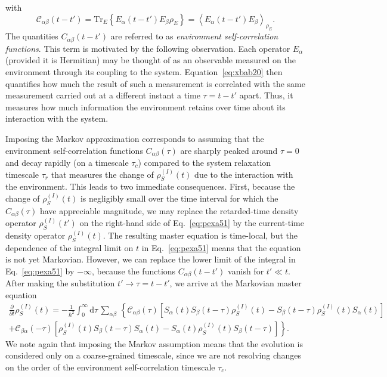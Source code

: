 \documentclass[3p,sort&compress]{elsarticle}
\newcommand{\D}{\ensuremath{\mathrm{d}}}
\newcommand{\op}[1]{#1}
\begin{document}
%
with
%
\begin{equation}
  \label{eq:xbab20}
\mathcal{C}_{\alpha\beta}(t-t') = \text{Tr}_E \left\{ \op{E}_\alpha(t-t')
    \op{E}_\beta \op{\rho}_E\right\} = \left\langle \op{E}_\alpha(t-t') \op{E}_\beta
  \right\rangle_{\op{\rho}_E}.
\end{equation}
%
The quantities $C_{\alpha\beta}(t-t')$ are referred to as \emph{environment self-correlation functions}. This term is motivated by the following observation. Each operator $\op{E}_\alpha$ (provided it is Hermitian) may be thought of as an observable measured on the environment through its coupling to the system. Equation~\eqref{eq:xbab20} then quantifies how much the result of such a measurement is correlated with the same measurement carried out at a different instant a time $\tau=t-t'$ apart. Thus, it measures how much information the environment retains over time about its interaction with the system. 

Imposing the Markov approximation corresponds to assuming that the environment self-correlation functions $C_{\alpha\beta}(\tau)$ are sharply peaked around $\tau = 0$ and decay rapidly (on a timescale $\tau_c$) compared to the system relaxation timescale $\tau_r$ that measures the change of $\op{\rho}^{(I)}_S(t)$ due to the interaction with the environment. This leads to two immediate consequences. First, because the change of $\op{\rho}^{(I)}_S(t)$ is negligibly small over the time interval for which the $C_{\alpha\beta}(\tau)$ have appreciable magnitude, we may replace the retarded-time density operator $\op{\rho}^{(I)}_S(t')$ on the right-hand side of Eq.~\eqref{eq:pexa51} by the current-time density operator $\op{\rho}^{(I)}_S(t)$. The resulting master equation is time-local, but the dependence of the integral limit on $t$ in Eq.~\eqref{eq:pexa51} means that the equation is not yet Markovian. However, we can replace the lower limit of the integral  in Eq.~\eqref{eq:pexa51} by $-\infty$, because the functions $C_{\alpha\beta}(t-t')$ vanish for $t' \ll t$. After making the substitution $t' \longrightarrow \tau = t-t'$, we arrive at the Markovian master equation
%
\begin{multline} 
\label{eq:pexarr} 
\frac{\partial}{\partial t}
\op{\rho}^{(I)}_S(t) =  - \frac{1}{\hbar^2}\int_0^\infty \D \tau
\, \sum_{\alpha\beta} \, \left\{ \mathcal{C}_{\alpha\beta}(\tau) \left[
    \op{S}_\alpha(t) \op{S}_\beta(t-\tau) \op{\rho}^{(I)}_S(t)
    - \op{S}_\beta(t-\tau) \op{\rho}^{(I)}_S(t) \op{S}_\alpha(t)
  \right]\right. \\ \left. + \mathcal{C}_{\beta\alpha}(-\tau) \left[
    \op{\rho}^{(I)}_S(t)\op{S}_\beta(t-\tau)  \op{S}_\alpha(t)
    - \op{S}_\alpha(t)\op{\rho}^{(I)}_S(t)\op{S}_\beta(t-\tau)
  \right] \right\}.
\end{multline}
%
We note again that imposing the Markov assumption means that the evolution is considered only on a coarse-grained timescale, since we are not resolving changes on the order of the environment self-correlation timescale $\tau_c$. 
\end{document}
